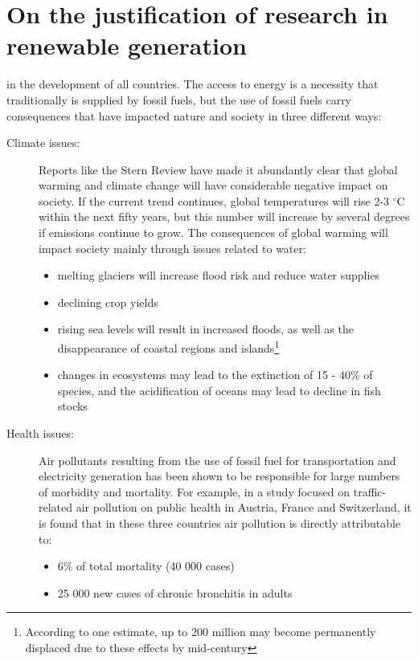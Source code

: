 \section{On the justification of research in renewable generation} %
\label{sec:justification}
 in the development of all countries. The access to energy is a necessity that traditionally is supplied by fossil fuels, but the use of fossil fuels carry consequences that have impacted nature and society in three different ways:
\begin{description}
	\item[Climate issues:] Reports like the Stern Review have made it abundantly clear that global warming and climate change will have considerable negative impact on society. If the current trend continues, global temperatures will rise 2-3 $^\circ$C within the next fifty years, but this number will increase by several degrees if emissions continue to grow. The consequences of global warming will impact society mainly through issues related to water:
		\begin{itemize}
			\item melting glaciers will increase flood risk and reduce water supplies
			\item declining crop yields
			\item rising sea levels will result in increased floods, as well as the disappearance of coastal regions and islands\footnote{According to one estimate, up to 200 million may become permanently displaced due to these effects by mid-century\cite{stern2006stern}}
			\item changes in ecosystems may lead to the extinction of 15 - 40\% of species, and the acidification of oceans may lead to decline in fish stocks
		\end{itemize}
	\item[Health issues:] Air pollutants resulting from the use of fossil fuel for transportation and electricity generation has been shown to be responsible for large numbers of morbidity and mortality. For example, in a study focused on traffic-related air pollution on public health in Austria, France and Switzerland, it is found that in these three countries air pollution is directly attributable to:
		\begin{itemize}
			\item 6\% of total mortality (40 000 cases)
			\item 25 000 new cases of chronic bronchitis in adults

\end{itemize}
\end{description}
